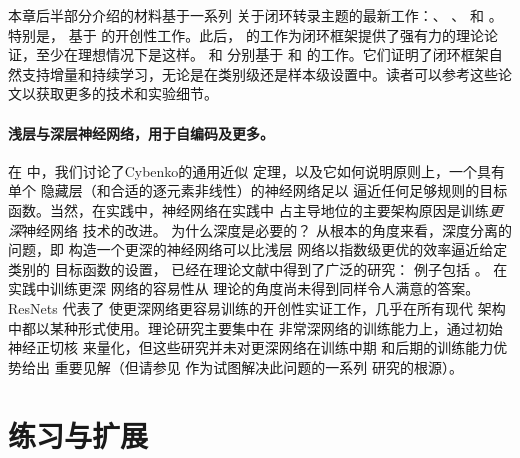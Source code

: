 \documentclass[../../book-main.tex]{subfiles}
\begin{document}
本章后半部分介绍的材料基于一系列
关于闭环转录主题的最新工作：\cite{Dai-entropy-2022}、
\cite{pai2022pursuit}、\cite{tong2023incremental} 和 \cite{pmlr-v234-tong24a}。特别是， 基于 \cite{Dai-entropy-2022} 的开创性工作。此后，\cite{pai2022pursuit} 的工作为闭环框架提供了强有力的理论论证，至少在理想情况下是这样。 和  分别基于 \cite{tong2023incremental} 和 \cite{pmlr-v234-tong24a} 的工作。它们证明了闭环框架自然支持增量和持续学习，无论是在类别级还是样本级设置中。读者可以参考这些论文以获取更多的技术和实验细节。


\paragraph{浅层与深层神经网络，用于自编码及更多。}
在  中，我们讨论了Cybenko的通用近似
定理，以及它如何说明原则上，一个具有单个
隐藏层（和合适的逐元素非线性）的神经网络足以
逼近任何足够规则的目标函数。当然，在实践中，神经网络在实践中
占主导地位的主要架构原因是训练\textit{更深}神经网络
技术的改进。
为什么深度是必要的？
从根本的角度来看，深度分离的问题，即
构造一个更深的神经网络可以比浅层
网络以指数级更优的效率逼近给定类别的
目标函数的设置，
已经在理论文献中得到了广泛的研究：
例子包括 \cite{Telgarsky2016-sn,Bresler2020-xy,Venturi2021-qc}。
在实践中训练更深
网络的容易性从
理论的角度尚未得到同样令人满意的答案。
ResNets \cite{he2016deep} 代表了
使更深网络更容易训练的开创性实证工作，几乎在所有现代
架构中都以某种形式使用。理论研究主要集中在
非常深网络的训练能力上，通过初始神经正切核
\cite{Buchanan2021-sj,Martens2021-cx} 来量化，但这些研究并未对更深网络在训练中期
和后期的训练能力优势给出
重要见解（但请参见 \cite{Yang2021-gw} 作为试图解决此问题的一系列
研究的根源）。

\section{练习与扩展}
\end{document}
